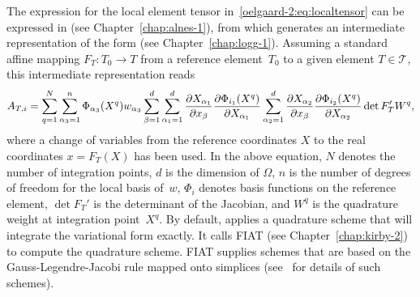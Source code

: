 The expression for the local element tensor
in~\eqref{oelgaard-2:eq:localtensor} can be expressed in \ufl{} (see
Chapter~\ref{chap:alnes-1}), from which \ffc{} generates an intermediate
representation of the form (see Chapter~\ref{chap:logg-1}).  Assuming a
standard affine mapping $F_T : T_0 \rightarrow T$ from a reference
element~$T_{0}$ to a given element $T \in \mathcal{T}$, this intermediate
representation reads
%
\begin{equation}
\small
  A_{T,i}
  =
  \sum_{q=1}^{N}
%
  \sum_{\alpha_{3}=1}^n
  \Phi_{\alpha_{3}}(X^q)
  w_{\alpha_{3}}
%
  \sum_{\beta=1}^d
  \sum_{\alpha_1=1}^d
  \frac{\partial X_{\alpha_1}}{\partial x_{\beta}}
  \frac{\partial \Phi_{i_1}(X^q)}{\partial X_{\alpha_1}}
  \sum_{\alpha_2=1}^d
  \frac{\partial X_{\alpha_2}}{\partial x_{\beta}}
  \frac{\partial \Phi_{i_2}(X^q)}{\partial X_{\alpha_2}}
  \det F_T'
  W^q,
\label{oelgaard-2:eq:weightedlaplacian_quadraturerepresentation}
\end{equation}
%
where a change of variables from the reference coordinates $X$ to the real
coordinates $x = F_T(X)$ has been used. In the above equation, $N$ denotes
the number of integration points, $d$ is the dimension of $\Omega$,
$n$ is the number of degrees of freedom for the local basis of~$w$,
$\Phi_{i}$ denotes basis functions on the reference element, $\det F_T'$
is the determinant of the Jacobian, and $W^q$ is the quadrature weight
at integration point~$X^q$.  By default, \ffc{} applies a quadrature
scheme that will integrate the variational form exactly.  It calls FIAT
(see Chapter~\ref{chap:kirby-2}) to compute the quadrature scheme.
FIAT supplies schemes that are based on the Gauss-Legendre-Jacobi rule
mapped onto simplices (see~\citet{KarniadakisSherwin2005} for details
of such schemes).

